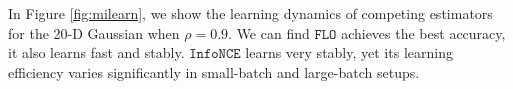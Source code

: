 \documentclass{article}
\theoremstyle{plain}
\theoremstyle{definition}
\theoremstyle{remark}
\newcommand{\infonce}{\texttt{InfoNCE}}
\newcommand{\TUBA}{\texttt{TUBA}}
\newcommand{\NWJ}{\texttt{NWJ}}
\newcommand{\FLO}{\texttt{FLO}}
\begin{document}
		In Figure {\ref{fig:milearn}}, we show the learning dynamics of competing estimators for the 20-D Gaussian when $\rho=0.9$. We can find $\FLO$ achieves the best accuracy, it also learns fast and stably. $\infonce$ learns very stably, yet its learning efficiency varies significantly in small-batch and large-batch setups. 
		
		
		
		
		
\end{document}
